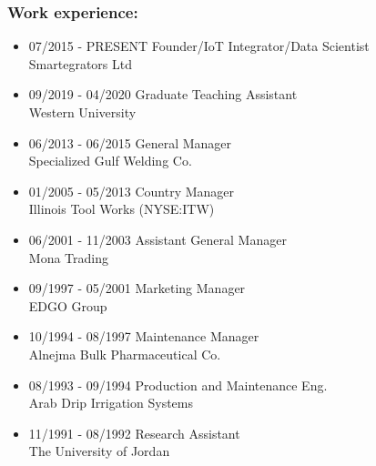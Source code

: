 \documentclass[11pt]{report}
\begin{document}
\subsubsection*{Work experience:}
\begin{itemize}[label={--}]

\item 07/2015 - PRESENT Founder/IoT Integrator/Data Scientist\\Smartegrators Ltd


\item 09/2019 - 04/2020 Graduate Teaching Assistant\\Western University

\item 06/2013 - 06/2015 General Manager\\Specialized Gulf Welding Co.

\item 01/2005 - 05/2013 Country Manager\\Illinois Tool Works (NYSE:ITW)

\item 06/2001 - 11/2003 Assistant General Manager\\Mona Trading

\item 09/1997 - 05/2001 Marketing Manager\\EDGO Group

\item 10/1994 - 08/1997 Maintenance Manager\\Alnejma Bulk Pharmaceutical Co.

\item 08/1993 - 09/1994 Production and Maintenance Eng.\\Arab Drip Irrigation Systems

\item 11/1991 - 08/1992 Research Assistant\\The University of Jordan

\end{itemize}





\singlespacing
\end{document}
